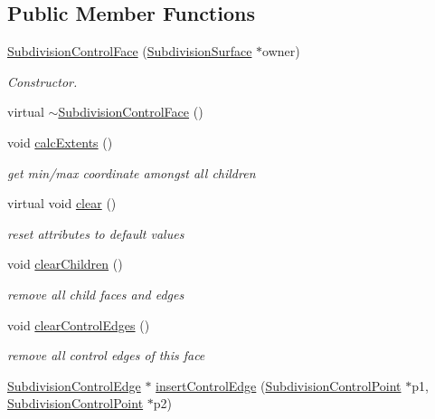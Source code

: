 \subsection*{Public Member Functions}
\begin{DoxyCompactItemize}
\item 
\hyperlink{classShipCAD_1_1SubdivisionControlFace_a9316495869082b0e3e27092118913644}{Subdivision\-Control\-Face} (\hyperlink{classShipCAD_1_1SubdivisionSurface}{Subdivision\-Surface} $\ast$owner)
\begin{DoxyCompactList}\small\item\em Constructor. \end{DoxyCompactList}\item 
virtual \hyperlink{classShipCAD_1_1SubdivisionControlFace_a7b092e764ec2708674afdb210196f761}{$\sim$\-Subdivision\-Control\-Face} ()
\item 
void \hyperlink{classShipCAD_1_1SubdivisionControlFace_a611c74ce3f346a745d4a694f5aab4ec2}{calc\-Extents} ()
\begin{DoxyCompactList}\small\item\em get min/max coordinate amongst all children \end{DoxyCompactList}\item 
virtual void \hyperlink{classShipCAD_1_1SubdivisionControlFace_ad168e31f0ef2537b3cd0f58b0c1c54e2}{clear} ()
\begin{DoxyCompactList}\small\item\em reset attributes to default values \end{DoxyCompactList}\item 
void \hyperlink{classShipCAD_1_1SubdivisionControlFace_a1501212af025c7e33ede929d50a76651}{clear\-Children} ()
\begin{DoxyCompactList}\small\item\em remove all child faces and edges \end{DoxyCompactList}\item 
void \hyperlink{classShipCAD_1_1SubdivisionControlFace_a390a79e26ced82b4a879aebd0c1dc862}{clear\-Control\-Edges} ()
\begin{DoxyCompactList}\small\item\em remove all control edges of this face \end{DoxyCompactList}\item 
\hyperlink{classShipCAD_1_1SubdivisionControlEdge}{Subdivision\-Control\-Edge} $\ast$ \hyperlink{classShipCAD_1_1SubdivisionControlFace_af585a1c8300791375b2df87fe2ebc4f5}{insert\-Control\-Edge} (\hyperlink{classShipCAD_1_1SubdivisionControlPoint}{Subdivision\-Control\-Point} $\ast$p1, \hyperlink{classShipCAD_1_1SubdivisionControlPoint}{Subdivision\-Control\-Point} $\ast$p2)

\end{DoxyCompactItemize}
